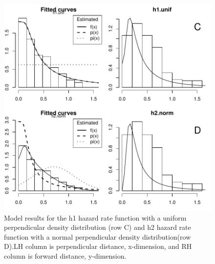\documentclass{article}
\begin{document}
\begin{figure}
\begin{center}
\includegraphics{WC86R1-figmod2}
\end{center}
\caption{Model results for the h1 hazard rate function with a uniform perpendicular density distribution (row C) and 
h2 hazard rate function with a normal perpendicular density distribution(row D).LH column is perpendicular distance, x-dimension, and RH column is forward distance, y-dimension.}
\label{fig:mod3and4}
\end{figure}
\clearpage
\end{document}
